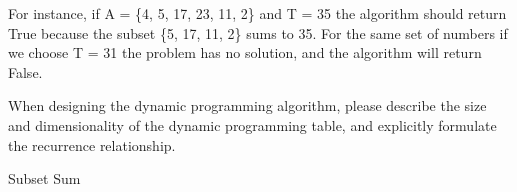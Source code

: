 \documentclass{article}[12pt]
\begin{document}
For instance, if A = \{4, 5, 17, 23, 11, 2\} and T = 35 the algorithm should return True because the subset \{5, 17, 11, 2\} sums to 35. For the same set of numbers if we choose T = 31 the problem has no solution, and the algorithm will return False.

When designing the dynamic programming algorithm, please describe the size and dimensionality of the dynamic programming table, and explicitly formulate the recurrence relationship. 

\begin{algorithm}[H]
\caption{Subset Sum}

\end{algorithm}
\end{document}
